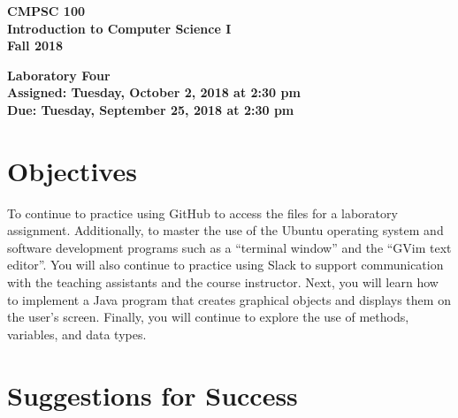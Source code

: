 \documentclass[11pt]{article}
\newcommand{\assignmentduedate}{September 25}
\newcommand{\assignmentassignedate}{October 2}
\newcommand{\assignmentnumber}{Four}
\newcommand{\labyear}{2018}
\newcommand{\labday}{Tuesday}
\newcommand{\labtime}{2:30 pm}
\newcommand{\assigneddate}{Assigned: \labday, \assignmentassignedate, \labyear{} at \labtime{}}
\newcommand{\duedate}{Due: \labday, \assignmentduedate, \labyear{} at \labtime{}}
\newcommand{\labtitle}[1]
{
  \begin{center}
    \begin{center}
      \bf
      CMPSC 100\\Introduction to Computer Science I\\
      Fall 2018\\
      \medskip
    \end{center}
    \bf
    #1
  \end{center}
}
\begin{document}
\thispagestyle{empty}

\labtitle{Laboratory \assignmentnumber{} \\ \assigneddate{} \\ \duedate{}}

\section*{Objectives}

To continue to practice using GitHub to access the files for a laboratory
assignment. Additionally, to master the use of the Ubuntu operating system and
software development programs such as a ``terminal window'' and the ``GVim text
editor''. You will also continue to practice using Slack to support
communication with the teaching assistants and the course instructor. Next, you
will learn how to implement a Java program that creates graphical objects and
displays them on the user's screen. Finally, you will continue to explore the
use of methods, variables, and data types.

\section*{Suggestions for Success}
\end{document}
